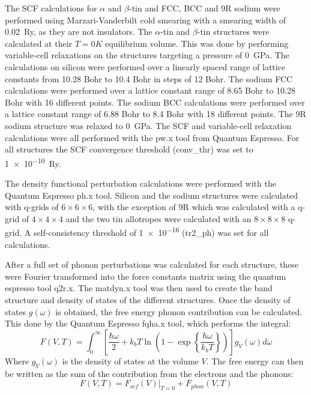 \documentclass[12pt]{article}
\begin{document}
The SCF calculations for $\alpha$ and $\beta$-tin and FCC, BCC and 9R sodium were performed using Marzari-Vanderbilt cold smearing \cite{marzari1999thermal} with a smearing width of \SI{0.02}{Ry}, as they are not insulators. 
The $\alpha$-tin and $\beta$-tin structures were calculated at their $T=0K$ equilibrium volume. This was done by performing variable-cell relaxations on the structures targeting a pressure of \SI{0}{\giga\pascal}. 
The calculations on silicon were performed over a linearly spaced range of lattice constants from 10.28 Bohr to 10.4 Bohr in steps of 12 Bohr. 
The sodium FCC calculations were performed over a lattice constant range of 8.65 Bohr to 10.28 Bohr with 16 different points. The sodium BCC calculations were performed over a lattice constant range of 6.88 Bohr to 8.4 Bohr with 18 different points.
The 9R sodium structure was relaxed to \SI{0}{\giga\pascal}. The SCF and variable-cell relaxation calculations were all performed with the pw.x tool from Quantum Espresso. For all structures the SCF convergence threshold (conv\_thr) was set to \SI{1e-10}{Ry}.

The density functional perturbation calculations were performed with the Quantum Espresso ph.x tool. Silicon and the sodium structures were calculated with q-grids of $6\times 6\times 6$, with the exception of 9R which was calculated with a q-grid of $4\times4\times4$ and the two tin allotropes were calculated with an $8\times8\times8$ q-grid. A self-consistency threshold of \num{1e-16} (tr2\_ph) was set for all calculations.

After a full set of phonon perturbations was calculated for each structure, these were Fourier transformed into the force constants matrix using the quantum espresso tool q2r.x. The matdyn.x tool was then used to create the band structure and density of states of the different structures. Once the density of states $g(\omega)$ is obtained, the free energy phonon contribution can be calculated. This done by the Quantum Espresso fqha.x tool, which performs the integral:
\begin{equation}
	\label{eq:phononfreeenergy}
	F(V, T) = \int_0^\infty \left[\frac{\hbar\omega}{2} + k_bT \ln\left(1-\exp\left\{\frac{\hbar \omega}{k_bT}\right\} \right) \right]g_V(\omega) d\omega
\end{equation}
Where $g_V(\omega)$ is the density of states at the volume $V$. The free energy can then be written as the sum of the contribution from the electrons and the phonons: 
\begin{equation}\label{eq:total_free_energy}
F(V, T) = F_{scf}(V)|_{T=0} + F_{phon}(V, T)
\end{equation}
\end{document}

